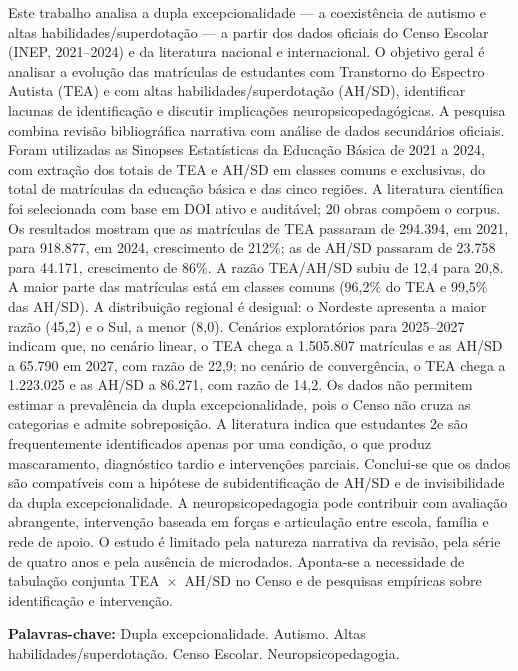 \begingroup
{}
\noindent
Este trabalho analisa a dupla excepcionalidade --- a coexistência de autismo e altas habilidades/superdotação --- a partir dos dados oficiais do Censo Escolar (INEP, 2021--2024) e da literatura nacional e internacional. O objetivo geral é analisar a evolução das matrículas de estudantes com Transtorno do Espectro Autista (TEA) e com altas habilidades/superdotação (AH/SD), identificar lacunas de identificação e discutir implicações neuropsicopedagógicas. A pesquisa combina revisão bibliográfica narrativa com análise de dados secundários oficiais. Foram utilizadas as Sinopses Estatísticas da Educação Básica de 2021 a 2024, com extração dos totais de TEA e AH/SD em classes comuns e exclusivas, do total de matrículas da educação básica e das cinco regiões. A literatura científica foi selecionada com base em DOI ativo e auditável; 20 obras compõem o corpus. Os resultados mostram que as matrículas de TEA passaram de 294.394, em 2021, para 918.877, em 2024, crescimento de 212\%; as de AH/SD passaram de 23.758 para 44.171, crescimento de 86\%. A razão TEA/AH/SD subiu de 12,4 para 20,8. A maior parte das matrículas está em classes comuns (96,2\% do TEA e 99,5\% das AH/SD). A distribuição regional é desigual: o Nordeste apresenta a maior razão (45,2) e o Sul, a menor (8,0). Cenários exploratórios para 2025--2027 indicam que, no cenário linear, o TEA chega a 1.505.807 matrículas e as AH/SD a 65.790 em 2027, com razão de 22,9; no cenário de convergência, o TEA chega a 1.223.025 e as AH/SD a 86.271, com razão de 14,2. Os dados não permitem estimar a prevalência da dupla excepcionalidade, pois o Censo não cruza as categorias e admite sobreposição. A literatura indica que estudantes 2e são frequentemente identificados apenas por uma condição, o que produz mascaramento, diagnóstico tardio e intervenções parciais. Conclui-se que os dados são compatíveis com a hipótese de subidentificação de AH/SD e de invisibilidade da dupla excepcionalidade. A neuropsicopedagogia pode contribuir com avaliação abrangente, intervenção baseada em forças e articulação entre escola, família e rede de apoio. O estudo é limitado pela natureza narrativa da revisão, pela série de quatro anos e pela ausência de microdados. Aponta-se a necessidade de tabulação conjunta TEA~$\times$~AH/SD no Censo e de pesquisas empíricas sobre identificação e intervenção.

\vspace{1em}
\noindent\textbf{Palavras-chave:} Dupla excepcionalidade. Autismo. Altas habilidades/superdotação. Censo Escolar. Neuropsicopedagogia.
\endgroup

